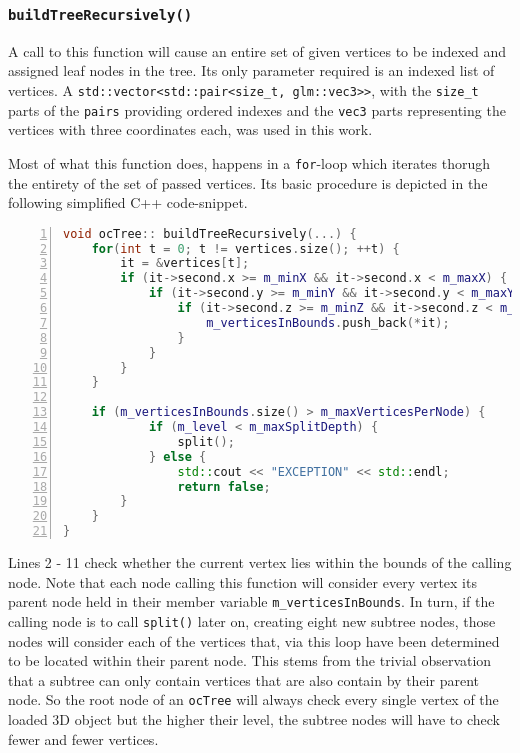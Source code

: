 	\subsubsection{\texttt{buildTreeRecursively()}}
	\label{sec:buildTreeRecursively}
A call to this function will cause an entire set of given vertices to be indexed and assigned leaf nodes in the tree. Its only parameter required is an indexed list of vertices. A \texttt{std::vector<std::pair<size\_t, glm::vec3>>}, with the \texttt{size\_t} parts of the \texttt{pairs} providing ordered indexes and the \texttt{vec3} parts representing the vertices with three coordinates each, was used in this work.

	Most of what this function does, happens in a \texttt{for}-loop which iterates thorugh the entirety of the set of passed vertices. Its basic procedure is depicted in the following simplified C++ code-snippet.

\begin{minipage}{\linewidth}
\begin{lstlisting}[language=C++,numberstyle=\zebra{black!5}{white}{},numbers=left,xleftmargin=2em,tabsize=3]
void ocTree:: buildTreeRecursively(...) {
	for(int t = 0; t != vertices.size(); ++t) {
		it = &vertices[t];
		if (it->second.x >= m_minX && it->second.x < m_maxX) {
			if (it->second.y >= m_minY && it->second.y < m_maxY) {
				if (it->second.z >= m_minZ && it->second.z < m_maxZ) {
					m_verticesInBounds.push_back(*it);
				}
			}
		}
	}

	if (m_verticesInBounds.size() > m_maxVerticesPerNode) {
			if (m_level < m_maxSplitDepth) {
				split();
			} else {
				std::cout << "EXCEPTION" << std::endl;
				return false;
		}
	}
}
\end{lstlisting}
\end{minipage}

Lines 2 - 11 check whether the current vertex lies within the bounds of the calling node. Note that each node calling this function will consider every vertex its parent node held in their member variable \texttt{m\_verticesInBounds}. In turn, if the calling node is to call \texttt{split()} later on, creating eight new subtree nodes, those nodes will consider each of the vertices that, via this loop have been determined to be located within their parent node. This stems from the trivial observation that a subtree can only contain vertices that are also contain by their parent node. So the root node of an \texttt{ocTree} will always check every single vertex of the loaded 3D object but the higher their level, the subtree nodes will have to check fewer and fewer vertices.

